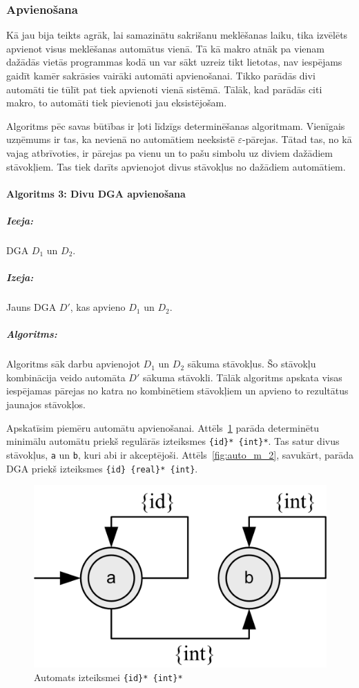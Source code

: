 \subsubsection{Apvienošana}

Kā jau bija teikts agrāk, lai samazinātu sakrišanu meklēšanas laiku, tika izvēlēts apvienot visus meklēšanas automātus vienā. Tā kā makro atnāk pa vienam dažādās vietās programmas kodā un var sākt uzreiz tikt lietotas, nav iespējams gaidīt kamēr sakrāsies vairāki automāti apvienošanai. Tikko parādās divi automāti tie tūlīt pat tiek apvienoti vienā sistēmā. Tālāk, kad parādās citi makro, to automāti tiek pievienoti jau eksistējošam.

Algoritms pēc savas būtības ir ļoti līdzīgs determinēšanas algoritmam. Vienīgais uzņēmums ir tas, ka nevienā no automātiem neeksistē $\varepsilon$-pārejas. Tātad tas, no kā vajag atbrīvoties, ir pārejas pa vienu un to pašu simbolu uz diviem dažādiem stāvokļiem. Tas tiek darīts apvienojot divus stāvokļus no dažādiem automātiem. 

\paragraph*{Algoritms 3: Divu DGA apvienošana}
\subparagraph{Ieeja:}DGA $D_1$ un $D_2$.
\subparagraph{Izeja:}Jauns DGA $D'$, kas apvieno $D_1$ un $D_2$.
\subparagraph{Algoritms:} 

Algoritms sāk darbu apvienojot $D_1$ un $D_2$ sākuma stāvokļus. Šo stāvokļu kombinācija veido automāta $D'$ sākuma stāvokli. Tālāk algoritms apskata visas iespējamas pārejas no katra no kombinētiem stāvokļiem un apvieno to rezultātus jaunajos stāvokļos. 

Apskatīsim piemēru automātu apvienošanai. Attēls~\ref{fig:auto_m_1} parāda determinētu minimālu automātu priekš regulārās izteiksmes \verb|{id}* {int}*|. Tas satur divus stāvokļus, \verb|a| un \verb|b|, kuri abi ir akceptējoši. Attēls~\ref{fig:auto_m_2}, savukārt, parāda DGA priekš izteiksmes \verb|{id} {real}* {int}|.

\begin{figure}[H]
  \centering
    \includegraphics[scale=1.5]{pictures/auto_m_1}
  \caption{\label{fig:auto_m_1}Automats izteiksmei \texttt{\{id\}* \{int\}*}}
\end{figure}

